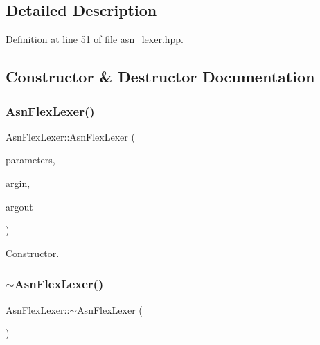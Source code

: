 \subsection{Detailed Description}


Definition at line 51 of file asn\+\_\+lexer.\+hpp.



\subsection{Constructor \& Destructor Documentation}
\mbox{\label{classAsnFlexLexer_aa1daf251342fdc1ed5b1b2fa6a40d486}} 
\subsubsection{\texorpdfstring{Asn\+Flex\+Lexer()}{AsnFlexLexer()}}
{\footnotesize\ttfamily Asn\+Flex\+Lexer\+::\+Asn\+Flex\+Lexer (\begin{DoxyParamCaption}\item[{const \hyperlink{Parameter_8hpp_a37841774a6fcb479b597fdf8955eb4ea}{Parameter\+Const\+Ref}}]{parameters,  }\item[{std\+::istream $\ast$}]{argin,  }\item[{std\+::ostream $\ast$}]{argout }\end{DoxyParamCaption})}



Constructor. 

\mbox{\label{classAsnFlexLexer_a6a77623de77e09c944c41852169cd306}} 
\subsubsection{\texorpdfstring{$\sim$\+Asn\+Flex\+Lexer()}{~AsnFlexLexer()}}
{\footnotesize\ttfamily Asn\+Flex\+Lexer\+::$\sim$\+Asn\+Flex\+Lexer (\begin{DoxyParamCaption}{ }\end{DoxyParamCaption})\hspace{0.3cm}{\ttfamily [override]}}



